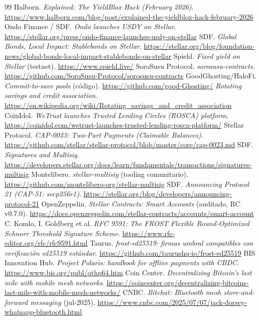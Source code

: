 \documentclass[twocolumn,10pt]{article}
\begin{document}
\begin{thebibliography}{99}
 Halborn. \emph{Explained: The YieldBlox Hack (February 2026)}. \url{https://www.halborn.com/blog/post/explained-the-yieldblox-hack-february-2026}
 Ondo Finance / SDF. \emph{Ondo launches USDY on Stellar}. \url{https://stellar.org/press/ondo-finance-launches-usdy-on-stellar}
 SDF. \emph{Global Bonds, Local Impact: Stablebonds on Stellar}. \url{https://stellar.org/blog/foundation-news/global-bonds-local-impact-stablebonds-on-stellar}
 Spield. \emph{Fixed yield on Stellar} (testnet). \url{https://www.spield.live/}
 SoroSusu Protocol. \emph{sorosusu-contracts}. \url{https://github.com/SoroSusu-Protocol/sorosusu-contracts}
 GoodGhosting/HaloFi. \emph{Commit-to-save pools} (c\'odigo). \url{https://github.com/good-Ghosting/}
 \emph{Rotating savings and credit association}. \url{https://en.wikipedia.org/wiki/Rotating_savings_and_credit_association}
 CoinIdol. \emph{WeTrust launches Trusted Lending Circles (ROSCA) platform}. \url{https://coinidol.com/wetrust-launches-trusted-lending-rosca-platform/}
 Stellar Protocol. \emph{CAP-0023: Two-Part Payments (Claimable Balances)}. \url{https://github.com/stellar/stellar-protocol/blob/master/core/cap-0023.md}
 SDF. \emph{Signatures and Multisig}. \url{https://developers.stellar.org/docs/learn/fundamentals/transactions/signatures-multisig}
 Montelibero. \emph{stellar-multisig} (tooling comunitario). \url{https://github.com/montelibero-org/stellar-multisig}
 SDF. \emph{Announcing Protocol 21 (CAP-51: secp256r1)}. \url{https://stellar.org/blog/developers/announcing-protocol-21}
 OpenZeppelin. \emph{Stellar Contracts: Smart Accounts} (auditado, RC v0.7.0). \url{https://docs.openzeppelin.com/stellar-contracts/accounts/smart-account}
 C. Komlo, I. Goldberg et al. \emph{RFC 9591: The FROST Flexible Round-Optimized Schnorr Threshold Signature Scheme}. \url{https://www.rfc-editor.org/rfc/rfc9591.html}
 Taurus. \emph{frost-ed25519: firmas umbral compatibles con verificaci\'on ed25519 est\'andar}. \url{https://github.com/taurushq-io/frost-ed25519}
 BIS Innovation Hub. \emph{Project Polaris: handbook for offline payments with CBDC}. \url{https://www.bis.org/publ/othp64.htm}
 Coin Center. \emph{Decentralizing Bitcoin's last mile with mobile mesh networks}. \url{https://coincenter.org/decentralizing-bitcoins-last-mile-with-mobile-mesh-networks/}
 CNBC. \emph{Bitchat: Bluetooth mesh store-and-forward messaging} (jul-2025). \url{https://www.cnbc.com/2025/07/07/jack-dorsey-whatsapp-bluetooth.html}

\end{thebibliography}
\end{document}
